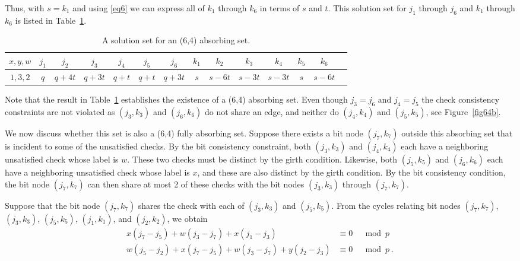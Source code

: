 Thus, with $s=k_1$ and using \eqref{eq6} we can express all of $k_1$
through $k_6$ in terms of $s$ and $t$. This solution set for $j_1$
through $j_6$ and $k_1$ through $k_6$ is listed in
Table~\ref{table64b}.

\hspace{-0.2in}\small{\hspace{-0.2in}\begin{table}[ht]\vspace{-0.05in}\hspace{-0.2in}
\begin{tabular}{|c |c|c|c|c|c|c|c|c|c|c|c|c|c|}
  \hline
  $x,y,w$ & $j_1$ & $j_2$ & $j_3$ & $j_4$ & $j_5$ & $j_6$ & $k_1$ & $k_2$ & $k_3$ & $k_4$ & $k_5$ & $k_6$ \\
  \hline
$1,3,2$&  $q$ & $q+4t$ &  $q+3t$ &  $q+t$ &  $q+t$ & $q+3t$ & $s$ &
$s-6t$ & $s-3t$ & $s-3t$ & $s$ &
  $s-6t$\\
  \hline
\end{tabular}
\caption{ A solution set for an (6,4) absorbing
set.}\label{table64b}
\end{table}}
\normalsize

Note that the result in Table~\ref{table64b} establishes the
existence of a (6,4) absorbing set. Even though $j_3=j_6$ and
$j_4=j_5$ the check consistency constraints are not violated as
$(j_3,k_3)$ and $(j_6,k_6)$ do not share an edge, and neither do
$(j_4,k_4)$ and $(j_5,k_5)$, see Figure~\ref{fig64b}.

 We now discuss whether this set is
also a (6,4) fully absorbing set. Suppose there exists a bit node
$(j_7,k_7)$ outside this absorbing set that is incident to some of
the unsatisfied checks. By the bit consistency constraint, both
$(j_3,k_3)$ and $(j_4,k_4)$ each have a neighboring unsatisfied
check whose label is $w$. These two checks must be distinct by the
girth condition. Likewise, both $(j_5,k_5)$ and $(j_6,k_6)$ each
have a neighboring unsatisfied check whose label is $x$, and these
are also distinct by the girth condition. By the bit consistency
condition, the bit node $(j_7,k_7)$ can then share at most 2 of
these checks with the bit nodes $(j_3,k_3)$ through $(j_7,k_7)$.

Suppose that the bit node $(j_7,k_7)$ shares the check with each
of $(j_3,k_3)$ and $(j_5,k_5)$. From the cycles relating bit nodes
$(j_7,k_7)$, $(j_3,k_3)$, $(j_5,k_5)$, $(j_1,k_1)$, and
$(j_2,k_2)$, we obtain
\begin{eqnarray*}
x(j_7-j_5)+w(j_3-j_7)+x(j_1-j_3) &\equiv 0& \mod p\\
w(j_5-j_2)+x(j_7-j_5)+w(j_3-j_7)+y(j_2-j_3) &\equiv 0& \mod p~.
\end{eqnarray*}


